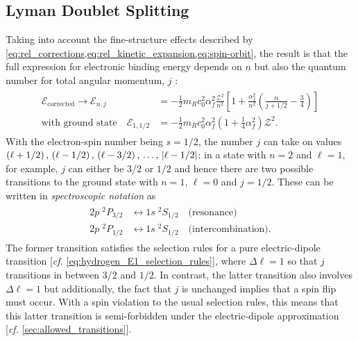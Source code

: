 \subsection{Lyman Doublet Splitting}
Taking into account the fine-structure effects described by \cref{eq:rel_corrections,eq:rel_kinetic_expansion,eq:spin-orbit}, the result is that the full expression for electronic binding energy depends on $n$ but also the quantum number for total angular momentum, $j$ \cite{Griffiths05,Townsend00}:
\begin{align}\label{eq:fine_hydrogen_energy_Z}
 \begin{split}
 \mathcal{E}_{\text{corrected}} \to \mathcal{E}_{n,j} &= - \frac{1}{2} m_R c_0^2 \alpha^2_f \frac{\mathcal{Z}^2}{n^2} \left[ 1 + \frac{\alpha_f^2}{n^2} \left( \frac{n}{j + 1/2} - \frac{3}{4} \right) \right] \\
 \text{with ground state} \quad \mathcal{E}_{1,1/2} &= - \frac{1}{2} m_R c_0^2 \alpha^2_f \left( 1 + \frac{1}{4} \alpha_f^2 \right) \mathcal{Z}^2 . 
 \end{split}
 \end{align}
With the electron-spin number being $s = 1/2$, the number $j$ can take on values $\left( \ell + 1/2 \right), \, \left( \ell - 1/2 \right), \, \left( \ell -3/2 \right), \, \ldots, \, \abs{\ell - 1/2}$: in a state with $n=2$ and $\ell = 1$, for example, $j$ can either be $3/2$ or $1/2$ and hence there are two possible transitions to the ground state with $n=1$, $\ell=0$ and $j = 1/2$. 
These can be written in \emph{spectroscopic notation} as \cite{Rybicki86}
\begin{align}\label{eq:hydrogen_doublet}
 \begin{split}
 2 p \; {}^2 \! P_{3/2} &\leftrightarrow 1 s \; {}^2 \! S_{1/2} \quad \text{(resonance)} \\ 
 2 p \; {}^2 \! P_{1/2} &\leftrightarrow 1 s \; {}^2 \! S_{1/2} \quad \text{(intercombination)}.
 \end{split}
 \end{align}
The former transition satisfies the selection rules for a pure electric-dipole transition [\emph{cf.\@} \cref{eq:hydrogen_E1_selection_rules}], where $\Delta \ell =1$ so that $j$ transitions in between $3/2$ and $1/2$. 
In contrast, the latter transition also involves $\Delta \ell =1$ but additionally, the fact that $j$ is unchanged implies that a spin flip must occur. 
With a spin violation to the usual selection rules, this means that this latter transition is semi-forbidden under the electric-dipole approximation [\emph{cf.\@} \cref{sec:allowed_transitions}]. 

